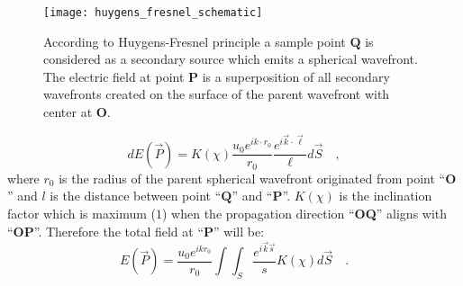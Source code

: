 \begin{figure}[t!]
  \centering
  \texttt{[image: huygens\_fresnel\_schematic]}
  \caption{According to Huygens-Fresnel principle a sample point $\mathbf{Q}$ is considered as a secondary source which emits a spherical wavefront. The electric field at point $\mathbf{P}$ is a superposition of all secondary wavefronts created on the surface of the parent wavefront with center at $\mathbf{O}$.}
  \label{fig:huygens_fresnel}
\end{figure}


\begin{equation}
\label{eq:huygen_fresnel}
dE(\vec{P}) = K(\chi) \frac{u_0 e^{ik \cdot r_0}}{r_0}\frac{e^{i\vec{k}\cdot\vec{\ell}}}{\ell} d\vec{S} \quad ,
\end{equation}
where $r_0$ is the radius of the parent spherical wavefront originated from point ``$\mathbf{O}$'' and $l$ is the distance between point ``$\mathbf{Q}$'' and ``$\mathbf{P}$''. $K(\chi)$ is the inclination factor which is maximum ($1$) when the propagation direction ``\textbf{OQ}'' aligns with ``\textbf{OP}''. Therefore the total field at ``\textbf{P}'' will be:
\begin{equation}
\label{eq:E_P}
E(\vec{P}) =  \frac{u_0 e^{ikr_0}}{r_0} \int \int _{S} \frac{e^{i\vec{k}\vec{s}}}{s}  K(\chi) d\vec{S} \quad .
\end{equation}

